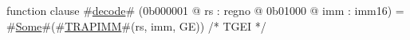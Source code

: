 function clause #\hyperref[zdecode]{decode}# (0b000001 @ rs : regno @ 0b01000 @ imm : imm16) =
  #\hyperref[zSome]{Some}#(#\hyperref[zTRAPIMM]{TRAPIMM}#(rs, imm, GE)) /* TGEI */
